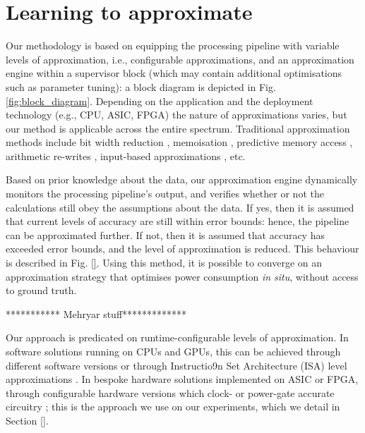 \section{Learning to approximate}\label{learning}

Our methodology is based on equipping the processing pipeline with variable levels of approximation, i.e., configurable approximations, and an approximation engine within a supervisor block (which may contain additional optimisations such as parameter tuning): a block diagram is depicted in Fig. \ref{fig:block_diagram}. Depending on the application and the deployment technology (e.g., CPU, ASIC, FPGA) the nature of approximations varies, but our method is applicable across the entire spectrum. Traditional approximation methods include bit width reduction \cite{mittal2016survey}, memoisation \cite{sinha2016low}, predictive memory access \cite{yazdanbakhsh2016mitigating}, arithmetic re-writes \cite{nepal2016automated}, input-based approximations \cite{raha2016input}, etc.
\par Based on prior knowledge about the data, our approximation engine dynamically monitors the processing pipeline's output, and verifies whether or not the calculations still obey the assumptions about the data. If yes, then it is assumed that current levels of accuracy are still within error bounds: hence, the pipeline can be approximated further. If not, then it is assumed that accuracy has exceeded error bounds, and the level of approximation is reduced. This behaviour is described in Fig. \ref{}. Using this method, it is possible to converge on an approximation strategy that optimises power consumption \textit{in situ}, without access to ground truth. 
	 \par ************ Mehryar stuff************* 
\par Our approach is predicated on runtime-configurable levels of approximation. In software solutions running on CPUs and GPUs, this can be achieved through different software versions \cite{vassiliadis2015programming} or through Instructio9n Set Architecture (ISA) level approximations \cite{venkataramani2013quality}. In bespoke hardware solutions implemented on ASIC or FPGA, through configurable hardware versions which clock- or power-gate accurate circuitry \cite{chan2013statistical}; this is the approach we use on our experiments, which we detail in Section \ref{}.

